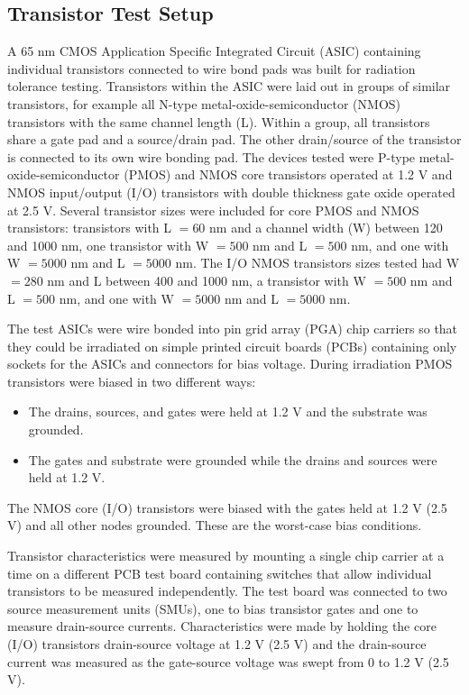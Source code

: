 \subsection{Transistor Test Setup}

A 65 nm CMOS Application Specific Integrated Circuit (ASIC) containing individual transistors connected to wire bond pads was built for radiation tolerance testing. Transistors within the ASIC were laid out in groups of similar transistors, for example all N-type metal-oxide-semiconductor (NMOS) transistors with the same channel length (L). Within a group, all transistors share a gate pad and a source/drain pad. The other drain/source of the transistor is connected to its own wire bonding pad. The devices tested were P-type metal-oxide-semiconductor (PMOS) and NMOS core transistors operated at 1.2 V and NMOS input/output (I/O) transistors with double thickness gate oxide operated at 2.5 V. Several transistor sizes were included for core PMOS and NMOS transistors: transistors with L $=60$ nm and a channel width (W) between 120 and 1000 nm, one transistor with W $=500$ nm and L $=500$ nm, and one with W $=5000$ nm and L $=5000$ nm. The I/O NMOS transistors sizes tested had W $=280$ nm and L between 400 and 1000 nm, a transistor with W $=500$ nm and L $=500$ nm, and one with W $=5000$ nm and L $=5000$ nm.

The test ASICs were wire bonded into pin grid array (PGA) chip carriers so that they could be irradiated on simple printed circuit boards (PCBs) containing only sockets for the ASICs and connectors for bias voltage. During irradiation PMOS transistors were biased in two different ways: 

\begin{itemize}
\item The drains, sources, and gates were held at 1.2 V and the substrate was grounded. 
\item The gates and substrate were grounded while the drains and sources were held at 1.2 V. 
\end{itemize}
The NMOS core (I/O) transistors were biased with the gates held at 1.2 V (2.5 V) and all other nodes grounded. These are the worst-case bias conditions.

Transistor characteristics were measured by mounting a single chip carrier at a time on a different PCB test board containing switches that allow individual transistors to be measured independently. The test board was connected to two source measurement units (SMUs), one to bias transistor gates and one to measure drain-source currents. Characteristics were made by holding the core (I/O) transistors drain-source voltage at 1.2 V (2.5 V) and the drain-source current was measured as the gate-source voltage was swept from 0 to 1.2 V (2.5 V). 

